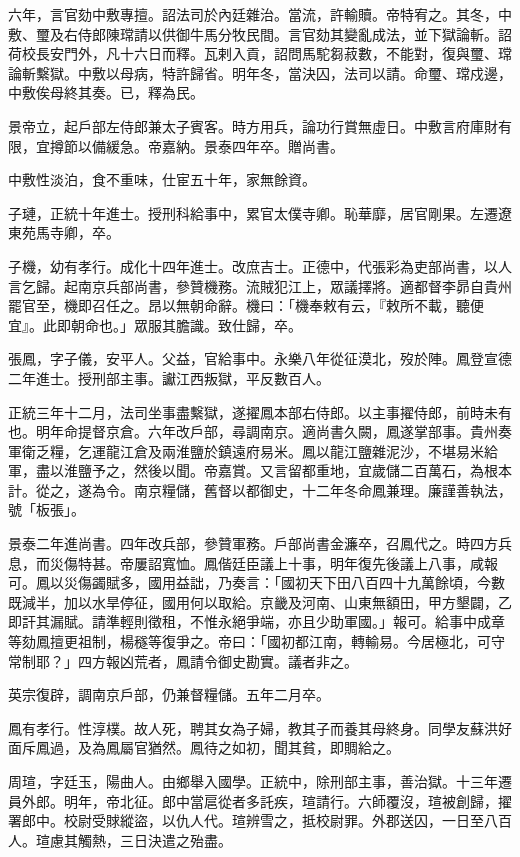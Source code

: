 \begin{pinyinscope}
六年，言官劾中敷專擅。詔法司於內廷雜治。當流，許輸贖。帝特宥之。其冬，中敷、璽及右侍郎陳瑺請以供御牛馬分牧民間。言官劾其變亂成法，並下獄論斬。詔荷校長安門外，凡十六日而釋。瓦剌入貢，詔問馬駝芻菽數，不能對，復與璽、瑺論斬繫獄。中敷以母病，特許歸省。明年冬，當決囚，法司以請。命璽、瑺戍邊，中敷俟母終其奏。已，釋為民。

景帝立，起戶部左侍郎兼太子賓客。時方用兵，論功行賞無虛日。中敷言府庫財有限，宜撙節以備緩急。帝嘉納。景泰四年卒。贈尚書。

中敷性淡泊，食不重味，仕宦五十年，家無餘資。

子璉，正統十年進士。授刑科給事中，累官太僕寺卿。恥華靡，居官剛果。左遷遼東苑馬寺卿，卒。

子機，幼有孝行。成化十四年進士。改庶吉士。正德中，代張彩為吏部尚書，以人言乞歸。起南京兵部尚書，參贊機務。流賊犯江上，眾議擇將。適都督李昴自貴州罷官至，機即召任之。昂以無朝命辭。機曰：「機奉敕有云，『敕所不載，聽便宜』。此即朝命也。」眾服其膽識。致仕歸，卒。

張鳳，字子儀，安平人。父益，官給事中。永樂八年從征漠北，歿於陣。鳳登宣德二年進士。授刑部主事。讞江西叛獄，平反數百人。

正統三年十二月，法司坐事盡繫獄，遂擢鳳本部右侍郎。以主事擢侍郎，前時未有也。明年命提督京倉。六年改戶部，尋調南京。適尚書久闕，鳳遂掌部事。貴州奏軍衛乏糧，乞運龍江倉及兩淮鹽於鎮遠府易米。鳳以龍江鹽雜泥沙，不堪易米給軍，盡以淮鹽予之，然後以聞。帝嘉賞。又言留都重地，宜歲儲二百萬石，為根本計。從之，遂為令。南京糧儲，舊督以都御史，十二年冬命鳳兼理。廉謹善執法，號「板張」。

景泰二年進尚書。四年改兵部，參贊軍務。戶部尚書金濂卒，召鳳代之。時四方兵息，而災傷特甚。帝屢詔寬恤。鳳偕廷臣議上十事，明年復先後議上八事，咸報可。鳳以災傷蠲賦多，國用益詘，乃奏言：「國初天下田八百四十九萬餘頃，今數既減半，加以水旱停征，國用何以取給。京畿及河南、山東無額田，甲方墾闢，乙即訐其漏賦。請準輕則徵租，不惟永絕爭端，亦且少助軍國。」報可。給事中成章等劾鳳擅更祖制，楊穟等復爭之。帝曰：「國初都江南，轉輸易。今居極北，可守常制耶？」四方報凶荒者，鳳請令御史勘實。議者非之。

英宗復辟，調南京戶部，仍兼督糧儲。五年二月卒。

鳳有孝行。性淳樸。故人死，聘其女為子婦，教其子而養其母終身。同學友蘇洪好面斥鳳過，及為鳳屬官猶然。鳳待之如初，聞其貧，即賙給之。

周瑄，字廷玉，陽曲人。由鄉舉入國學。正統中，除刑部主事，善治獄。十三年遷員外郎。明年，帝北征。郎中當扈從者多託疾，瑄請行。六師覆沒，瑄被創歸，擢署郎中。校尉受賕縱盜，以仇人代。瑄辨雪之，抵校尉罪。外郡送囚，一日至八百人。瑄慮其觸熱，三日決遣之殆盡。


\end{pinyinscope}
